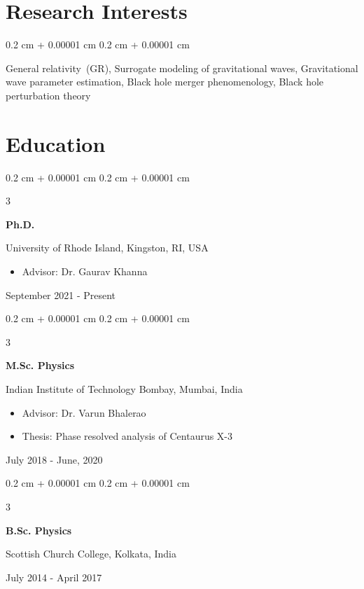 \documentclass[10pt, letterpaper]{article}
\newenvironment{highlights}{
    \begin{itemize}[
        topsep=0.10 cm,
        parsep=0.10 cm,
        partopsep=0pt,
        itemsep=0pt,
        leftmargin=0.4 cm + 10pt
    ]
}{
    \end{itemize}
}
\newenvironment{onecolentry}{
    \begin{adjustwidth}{
        0.2 cm + 0.00001 cm
    }{
        0.2 cm + 0.00001 cm
    }
}{
    \end{adjustwidth}
}
\newenvironment{threecolentry}[3][]{
    \onecolentry
    \def\thirdColumn{#3}
    \setcolumnwidth{2.5 cm, \fill, 4.5 cm}
    \begin{paracol}{3}
    {\raggedright #2} \switchcolumn
}{
    \switchcolumn \raggedleft \thirdColumn
    \end{paracol}
    \endonecolentry
}
\begin{document}
\vspace{0.3 cm - 0.3 cm}

\section{Research Interests}
  \begin{onecolentry}
    General relativity~(GR), Surrogate modeling of gravitational waves, Gravitational wave parameter estimation, Black hole merger phenomenology, Black hole perturbation theory
  \end{onecolentry}

\section{Education}
  \begin{threecolentry}{\textbf{Ph.D.}}{
    September 2021 - Present
  }
    University of Rhode Island, Kingston, RI, USA
    \begin{highlights}
      \item Advisor: Dr. Gaurav Khanna
    \end{highlights}
  \end{threecolentry}

\begin{threecolentry}{\textbf{M.Sc. Physics}}{
    July 2018 - June, 2020
  }
    Indian Institute of Technology Bombay, Mumbai, India
  \begin{highlights}
    \item Advisor: Dr. Varun Bhalerao
    \item Thesis: Phase resolved analysis of Centaurus X-3
  \end{highlights}
\end{threecolentry} 

\begin{threecolentry}{\textbf{B.Sc. Physics}}{
  July 2014 - April 2017
}
  Scottish Church College, Kolkata, India
\end{threecolentry}
\end{document}

